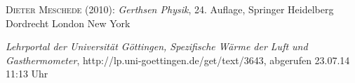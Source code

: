 \documentclass[12pt,a4paper,titlepage,headinclude,bibtotoc]{scrartcl}
\begin{document}
\begin{thebibliography}{100}

	\textsc{Dieter Meschede} (2010): \emph{Gerthsen Physik}, 24. Auflage, Springer Heidelberg
Dordrecht London New York

	\emph{Lehrportal der Universität Göttingen, Spezifische Wärme der Luft und Gasthermometer},
  http://lp.uni-goettingen.de/get/text/3643, abgerufen 23.07.14 11:13 Uhr

\end{thebibliography}
\end{document}
